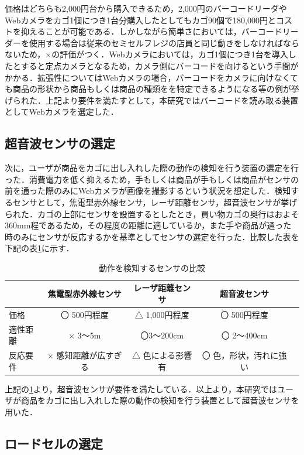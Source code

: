 価格はどちらも2,000円台から購入できるため，2,000円のバーコードリーダやWebカメラをカゴ1個につき1台分購入したとしてもカゴ90個で180,000円とコストを抑えることが可能である．しかしながら簡単さにおいては，バーコードリーダーを使用する場合は従来のセミセルフレジの店員と同じ動きをしなければならないため，×の評価がつく．Webカメラにおいては，カゴ1個につき1台を導入したとすると定点カメラとなるため，カメラ側にバーコードを向けるという手間がかかる．拡張性についてはWebカメラの場合，バーコードをカメラに向けなくても商品の形状から商品もしくは商品の種類をを特定できるようになる等の例が挙げられた．上記より要件を満たすとして，本研究ではバーコードを読み取る装置としてWebカメラを選定した．


\subsection{超音波センサの選定}


次に，ユーザが商品をカゴに出し入れした際の動作の検知を行う装置の選定を行った．消費電力を低く抑えるため，手もしくは商品が手もしくは商品がセンサの前を通った際のみにWebカメラが画像を撮影するという状況を想定した．検知するセンサとして，焦電型赤外線センサ，レーザ距離センサ，超音波センサが挙げられた．カゴの上部にセンサを設置するとしたとき，買い物カゴの奥行はおよそ360mm程であるため，その程度の距離に適しているか，また手や商品が通った時のみにセンサが反応するかを基準としてセンサの選定を行った．比較した表を下記の表\ref{kyori}に示す．


\begin{table}[htb]
\begin{center}
\caption{動作を検知するセンサの比較}
\begin{tabular}{|l|c|c|c|c|} \hline
 & 焦電型赤外線センサ & レーザ距離センサ & 超音波センサ \\ \hline \hline
価格 & 〇 500円程度 & △ 1,000円程度 & 〇 500円程度 \\
適性距離 & × 3～5m & 〇3～200cm & 〇 2～400cm \\ 
反応要件 & × 感知距離が広すぎる & △ 色による影響有 & 〇 色，形状，汚れに強い \\ \hline
\end{tabular}
\label{kyori}
\end{center}
\end{table}

上記の\ref{kyori}より，超音波センサが要件を満たしている．以上より，本研究ではユーザが商品をカゴに出し入れした際の動作の検知を行う装置として超音波センサを用いた．


\subsection{ロードセルの選定}

